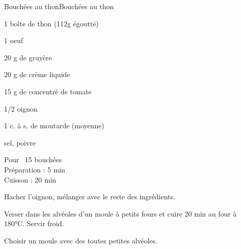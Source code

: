 \begin{recette}{Bouchées au thon}{Bouchées au thon}

\begin{ingredients}
1 boîte de thon (112g égoutté)\par
1 oeuf\par
20 g de gruyère\par
20 g de crème liquide\par
15 g de concentré de tomate\par
1/2 oignon\par
1 c. à s. de moutarde (moyenne)\par
sel, poivre\par
\end{ingredients}

\begin{infos}
Pour ~15 bouchées\\
Préparation : 5 min\\
Cuisson : 20 min\\
\end{infos}

\begin{etapes}
\item Hacher l'oignon, mélanger avec le reste des ingrédients.
\item Verser dans les alvéoles d'un moule à petits fours et cuire 20 min au four à 180°C. Servir froid.
\end{etapes}

\begin{conseils}
Choisir un moule avec des toutes petites alvéoles.
\end{conseils}

\end{recette}